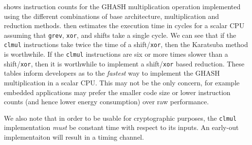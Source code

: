  shows instruction counts for the GHASH multiplication
operation implemented using the different combinations of base architecture,
multiplication and reduction methods.
 then estimates the execution time in cycles
for a scalar CPU assuming that {\tt grev}, {\tt xor}, and shifts take a
single cycle.
We can see that if the {\tt clmul} instructions take twice the time
of a shift/{\tt xor}, then the Karatsuba method is worthwhile.
If the {\tt clmul} instructions are six or more times slower than
a shift/{\tt xor}, then it is worthwhile to implement a shift/{\tt xor}
based reduction.
These tables inform developers as to the {\em fastest} way to implement
the GHASH multiplication in a scalar CPU.
This may not be the only concern, for example embedded applications may
prefer the smaller code size or lower instruction counts (and hence
lower energy consumption) over raw performance.

We also note that in order to be usable for cryptographic purposes, the
{\tt clmul} implementation {\em must} be constant time with respect
to its inputs.
An early-out implementaiton will result in a timing channel.

